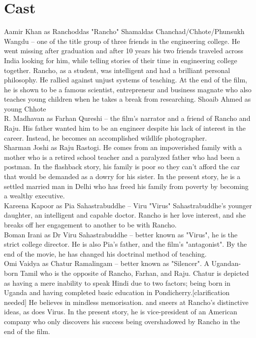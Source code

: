 \documentclass{article}
\begin{document}
\section{Cast}
Aamir Khan as Ranchoddas "Rancho" Shamaldas Chanchad/Chhote/Phunsukh Wangdu – one of the title group of three friends in the engineering college. He went missing after graduation and after 10 years his two friends traveled across India looking for him, while telling stories of their time in engineering college together. Rancho, as a student, was intelligent and had a brilliant personal philosophy. He rallied against unjust systems of teaching. At the end of the film, he is shown to be a famous scientist, entrepreneur and business magnate who also teaches young children when he takes a break from researching.
Shoaib Ahmed as young Chhote\\
R. Madhavan as Farhan Qureshi – the film's narrator and a friend of Rancho and Raju. His father wanted him to be an engineer despite his lack of interest in the career. Instead, he becomes an accomplished wildlife photographer.\\
Sharman Joshi as Raju Rastogi. He comes from an impoverished family with a mother who is a retired school teacher and a paralyzed father who had been a postman. In the flashback story, his family is poor so they can't afford the car that would be demanded as a dowry for his sister. In the present story, he is a settled married man in Delhi who has freed his family from poverty by becoming a wealthy executive.\\
Kareena Kapoor as Pia Sahastrabuddhe – Viru "Virus" Sahastrabuddhe's younger daughter, an intelligent and capable doctor. Rancho is her love interest, and she breaks off her engagement to another to be with Rancho.\\
Boman Irani as Dr Viru Sahastrabuddhe – better known as "Virus", he is the strict college director. He is also Pia's father, and the film's "antagonist". By the end of the movie, he has changed his doctrinal method of teaching.\\
Omi Vaidya as Chatur Ramalingam – better known as "Silencer". A Ugandan-born Tamil who is the opposite of Rancho, Farhan, and Raju. Chatur is depicted as having a mere inability to speak Hindi due to two factors; being born in Uganda and having completed basic education in Pondicherry.[clarification needed] He believes in mindless memorisation. and sneers at Rancho's distinctive ideas, as does Virus. In the present story, he is vice-president of an American company who only discovers his success being overshadowed by Rancho in the end of the film.\\
\end{document}
